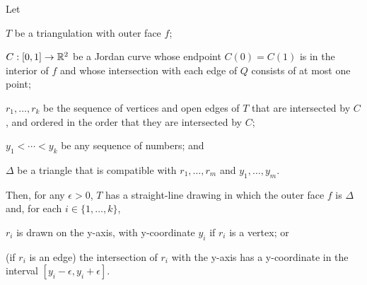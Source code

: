 \documentclass{patmorin}
\begin{document}
\begin{thm}
   Let
   \begin{compactenum}
     \item  $T$ be a triangulation with outer face $f$;
     \item  $C:[0,1]\to\mathbb{R}^2$ be a Jordan curve whose endpoint $C(0)=C(1)$
            is in the interior of $f$ and whose intersection with each
            edge of $Q$ consists of at most one point;
     \item $r_1,\ldots,r_k$ be the sequence of vertices and open edges
           of $T$ that are intersected by $C$, and ordered in the order
           that they are intersected by $C$;
     \item $y_1<\cdots<y_k$ be any sequence of numbers; and
     \item $\Delta$ be a triangle that is compatible with 
           $r_1,\ldots,r_m$ and $y_1,\ldots,y_m$.
  \end{compactenum}
   Then, for any $\epsilon>0$, $T$ has a
   straight-line drawing in which the outer face $f$ is $\Delta$
   and, for each $i\in\{1,\ldots,k\}$, 
   \begin{compactenum}
       \item $r_i$ is drawn on the y-axis, with y-coordinate $y_i$
         if $r_i$ is a vertex; or
       \item (if $r_i$ is an edge) the intersection of $r_i$ with the
         y-axis has a y-coordinate in the interval
         $[y_i-\epsilon,y_i+\epsilon]$.
   \end{compactenum}
\end{thm}
\end{document}
